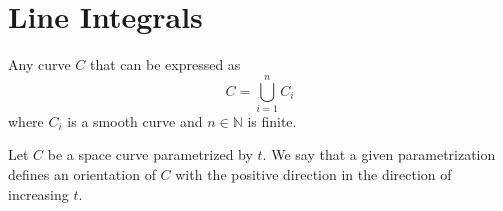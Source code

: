 \section{Line Integrals}
\begin{definition}
    Any curve \(C\) that can be expressed as 
    \[
        C=\bigcup_{i=1}^{n}C_i 
    \]
    where \(C_i\) is a smooth curve and \(n\in\mathbb{N}\) is finite.
\end{definition}
\begin{definition}
    Let \(C\) be a space curve parametrized by \(t\). We say that a given parametrization defines an orientation of \(C\) with the positive direction in the direction of increasing \(t\).
\end{definition}

